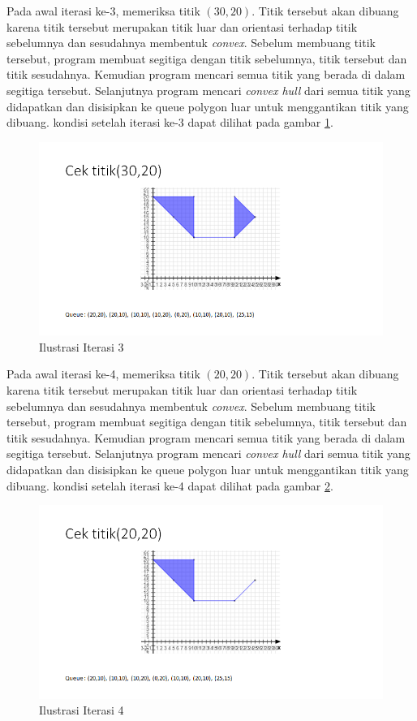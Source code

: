 \par Pada awal iterasi ke-3, memeriksa titik $(30,20)$. Titik tersebut akan dibuang karena titik tersebut merupakan titik luar dan orientasi terhadap titik sebelumnya dan sesudahnya membentuk \textit{convex}. Sebelum membuang titik tersebut, program membuat segitiga dengan titik sebelumnya, titik tersebut dan titik sesudahnya. Kemudian program mencari semua titik yang berada di dalam segitiga tersebut. Selanjutnya program mencari \textit{convex hull} dari semua titik yang didapatkan dan disisipkan ke queue polygon luar untuk menggantikan titik yang dibuang. kondisi setelah iterasi ke-3 dapat dilihat pada gambar \ref{fig:iterasi-3}.
\begin{figure}[!h]
	\Centering
	\includegraphics [width=\columnwidth]{bab5/img/iterasi-3}
	\caption {Ilustrasi Iterasi 3}
	\label {fig:iterasi-3}
\end{figure}

\par Pada awal iterasi ke-4, memeriksa titik $(20,20)$. Titik tersebut akan dibuang karena titik tersebut merupakan titik luar dan orientasi terhadap titik sebelumnya dan sesudahnya membentuk \textit{convex}. Sebelum membuang titik tersebut, program membuat segitiga dengan titik sebelumnya, titik tersebut dan titik sesudahnya. Kemudian program mencari semua titik yang berada di dalam segitiga tersebut. Selanjutnya program mencari \textit{convex hull} dari semua titik yang didapatkan dan disisipkan ke queue polygon luar untuk menggantikan titik yang dibuang. kondisi setelah iterasi ke-4 dapat dilihat pada gambar \ref{fig:iterasi-4}.
\begin{figure}[!h]
	\Centering
	\includegraphics [width=\columnwidth]{bab5/img/iterasi-4}
	\caption {Ilustrasi Iterasi 4}
	\label {fig:iterasi-4}
\end{figure}


